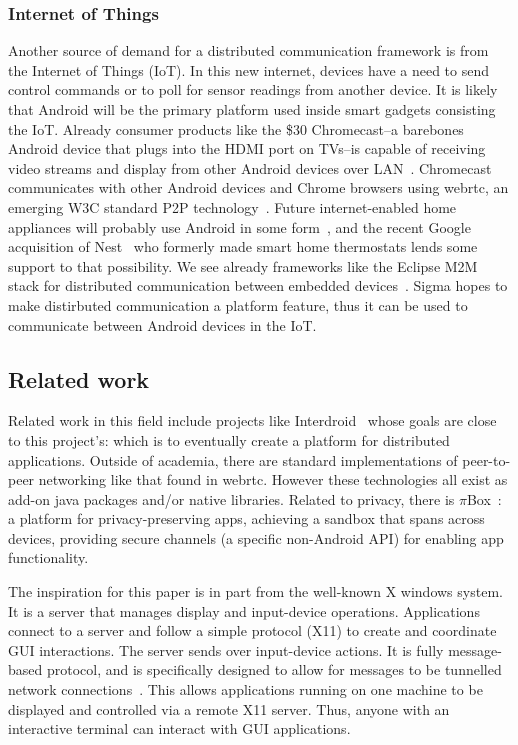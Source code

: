 \documentclass[prodmode]{acmlarge}
\begin{document}
\subsubsection{Internet of Things}
Another source of demand for a distributed communication framework is from the Internet of Things (IoT). In this new internet, devices have a need to send control commands or to poll for sensor readings from another device. It is likely that Android will be the primary platform used inside smart gadgets consisting the IoT. Already consumer products like the \$30 Chromecast--a barebones Android device that plugs into the HDMI port on TVs--is capable of receiving video streams and display from other Android devices over LAN~\cite{chromecast}. Chromecast communicates with other Android devices and Chrome browsers using webrtc, an emerging W3C standard P2P technology~\cite{ChromecastWebrtc}. Future internet-enabled home appliances will probably use Android in some form~\cite{AndroidEverywhere}, and the recent Google acquisition of Nest~\cite{GoogleNest} who formerly made smart home thermostats lends some support to that possibility. We see already frameworks like the Eclipse M2M stack for distributed communication between embedded devices~\cite{eclipse_m2m}. Sigma hopes to make distirbuted communication a platform feature, thus it can be used to communicate between Android devices in the IoT.

\subsection{Related work}
Related work in this field include projects like Interdroid~\cite{Interdroid} whose goals are close to this project's: which is to eventually create a platform for distributed applications. Outside of academia, there are standard implementations of peer-to-peer networking like that found in webrtc. However these technologies all exist as add-on java packages and/or native libraries. Related to privacy, there is $\pi$Box~\cite{piBox}: a platform for privacy-preserving apps, achieving a sandbox that spans across devices, providing secure channels (a specific non-Android API) for enabling app functionality.

The inspiration for this paper is in part from the well-known X windows system. It is a server that manages display and input-device  operations. Applications connect to a server and follow a simple protocol (X11) to create and coordinate GUI interactions. The server sends over input-device actions. It is fully message-based protocol, and is specifically designed to allow for messages to be tunnelled network connections~\cite{X11}. This allows applications running on one machine to be displayed and controlled via a remote X11 server. Thus, anyone with an interactive terminal can interact with GUI applications.
\end{document}
